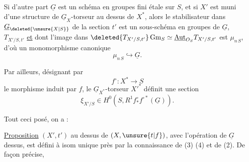 Si d'autre part $\underline G$ est un schéma en groupes fini étale sur $S$, et si $X'$ est muni d'une structure de $\underline G_X$-torseur au dessus de $X^\ast$, alors le stabilisateur
dans $\underline G_{\deleted{\unsure{X|S}}}$  de la section $t'$ est un sous-schéma en groupes  de $\underline G$,     $T_{X'/S,t'}$ \uline{et} dont l'image dans $\deleted{T_{X'/S,t'}}\,\mathrm{Gm}_S\simeq\underline{\mathrm{Aut}}_{O_S}T_{X'/S,t'}$ est $\mu_{n\,S}$, d'où un monomorphisme canonique
\[
\mu_{n\,S}\hookrightarrow\underline G . \tag*{(3)}
\]

Par ailleurs, désignant par
\[
f^\circ:X^\ast\longrightarrow S
\]
le morphisme induit par $f$, le $\underline G_{X^\ast}$-torseur $X'^\ast$ définit une section
\[
\xi_{X'/S}\in H^0(S,R^1 f^\circ_\ast f^{\circ\ast}(\underline G)) . \tag*{(4)}
\]

Tout ceci posé, on a :

\uline{Proposition} \quad $(X',t')$ au dessus de $(X,\unsure{t|f})$, avec l'opération de $\underline G$ dessus, est défini à isom unique près par la connaissance de (3) (4) et de (2).  De façon précise,
